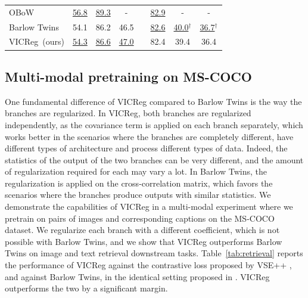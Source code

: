 \documentclass{article} %
\newcommand{\algo}{VICReg}
\begin{document}
\begin{table}[t]
\begin{tabular}{ @{} l ccc c ccc @{} }
	    OBoW \cite{gidaris2021obow}         & \underline{56.8} & \underline{89.3} & -    && \underline{82.9} & - & - \\
	    Barlow Twins~\cite{grill2020byol}   & 54.1 & 86.2 & 46.5 && \underline{82.6} & \hspace{0.41em}\underline{40.0}$^{\dagger}$ & \hspace{0.41em}\underline{36.7}$^{\dagger}$ \\
	    \algo \ (ours)                      & \underline{54.3} & \underline{86.6} & \underline{47.0} && 82.4 & 39.4 & 36.4 \\
      \bottomrule
    \end{tabular}
\end{table}

\subsection{Multi-modal pretraining on MS-COCO}

One fundamental difference of VICReg compared to Barlow Twins is the way the branches are regularized. In VICReg, both branches are regularized independently, as the covariance term is applied on each branch separately, which works better in the scenarios where the branches are completely different, have different types of architecture and process different types of data. Indeed, the statistics of the output of the two branches can be very different, and the amount of regularization required for each may vary a lot. In Barlow Twins, the regularization is applied on the cross-correlation matrix, which favors the scenarios where the branches produce outputs with similar statistics. We demonstrate the capabilities of VICReg in a multi-modal experiment where we pretrain on pairs of images and corresponding captions on the MS-COCO dataset. We regularize each branch with a different coefficient, which is not possible with Barlow Twins, and we show that VICReg outperforms Barlow Twins on image and text retrieval downstream tasks. Table~\ref{tab:retrieval} reports the performance of VICReg against the contrastive loss proposed by VSE++ \cite{faghri2018vse}, and against Barlow Twins, in the identical setting proposed in \cite{faghri2018vse}. VICReg outperforms the two by a significant margin.
\end{document}
